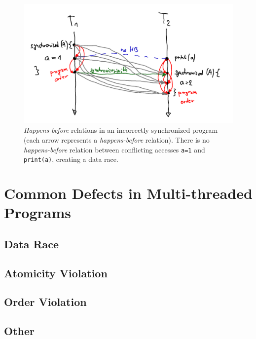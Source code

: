 \begin{figure}[hbt]
    \label{hb2}
    \includegraphics[width=\textwidth]{figures/sync_race.png}
    \caption{\emph{Happens-before} relations in an incorrectly synchronized
    program (each arrow represents a \emph{happens-before} relation). There is
    no \emph{happens-before} relation between conflicting accesses \texttt{a=1}
    and \texttt{print(a)}, creating a data race. }
\end{figure}


\section{Common Defects in Multi-threaded Programs}


\subsection{Data Race}

\todo{}

\subsection{Atomicity Violation}

\todo{}

\subsection{Order Violation}

\todo{}

\subsection{Other}

